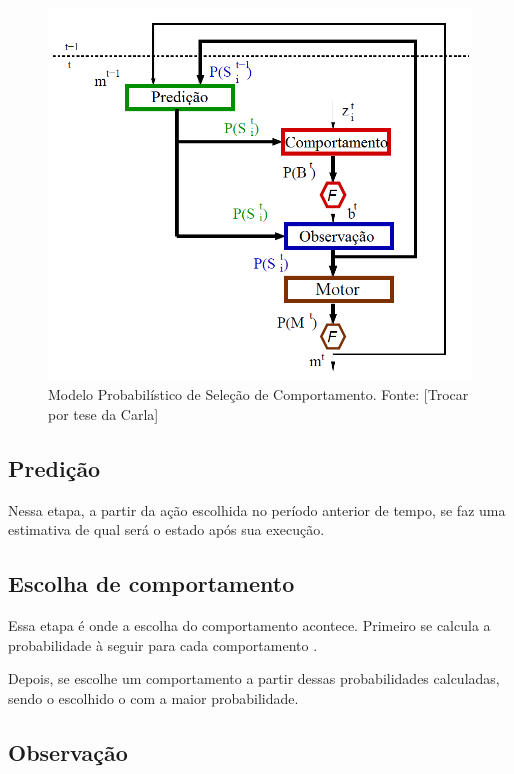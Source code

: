 \begin{figure}[h]
    \centering
    \includegraphics[width=120mm]{images/modelo_probabilistico-carla}
    \caption{\label{img:ModeloProbabilisticoCarla}Modelo Probabilístico de Seleção de Comportamento. Fonte: \cite{INCA2005} [Trocar por tese da Carla]}
\end{figure}

\subsection{Predição}

Nessa etapa, a partir da ação escolhida no período anterior de tempo, se faz uma estimativa de qual será o estado após sua execução.




\subsection{Escolha de comportamento}

Essa etapa é onde a escolha do comportamento acontece. Primeiro se calcula a probabilidade à seguir para cada comportamento .



Depois, se escolhe um comportamento a partir dessas probabilidades calculadas, sendo o escolhido o com a maior probabilidade.

\subsection{Observação}

